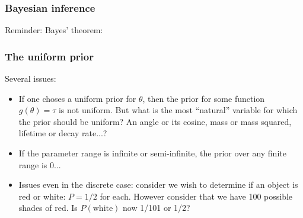 \documentclass[9pt]{beamer}
\newif\ifmynote
\newcommand\mynote[1]{%
\ifmynote \textbf{#1} \else \fi
}
\begin{document}
\begin{frame}
 \frametitle{Bayesian inference}
 
 \mynote{Write Bayes' theorem on the black board}
 
 Reminder: Bayes' theorem:
 
 
 
\end{frame}

\begin{frame}
 \frametitle{The uniform prior}
 
 Several issues:
 
 \begin{itemize}
  \item<1-> If one choses a uniform prior for $\theta$, then the prior for some function $g(\theta) = \tau$ is not uniform. But what is the most ``natural'' variable for which the prior should be uniform? An angle or its cosine, mass or mass squared, lifetime or decay rate...?
  \item<2-> If the parameter range is infinite or semi-infinite, the prior over any finite range is 0...
  \item<3-> Issues even in the discrete case: consider we wish to determine if an object is red or white: $P=1/2$ for each. However consider that we have 100 possible shades of red. 
  Is $P(\text{white})$ now 1/101 or 1/2?
 \end{itemize}
\end{frame}
\end{document}
